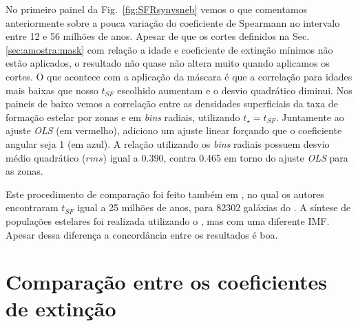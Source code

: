 No primeiro painel da Fig.\ \ref{fig:SFRsynvsneb} vemos o que comentamos anteriormente sobre a pouca
variação do coeficiente de Spearmann no intervalo entre 12 e 56 milhões de anos. Apesar de que os
cortes definidos na Sec. \ref{sec:amostra:mask} com relação a idade e coeficiente de extinção
mínimos não estão aplicados, o resultado não quase não altera muito quando aplicamos os cortes. O
que acontece com a aplicação da máscara é que a correlação para idades mais baixas que nosso
$t_{SF}$ escolhido aumentam e o desvio quadrático diminui. Nos paineis de baixo vemos a correlação
entre as densidades superficiais da taxa de formação estelar por zonas e em {\em bins} radiais,
utilizando $t_\star = t_{SF}$. Juntamente ao ajuste {\em OLS} (em vermelho), adiciono um ajuste
linear forçando que o coeficiente angular seja 1 (em azul). A relação utilizando os {\em bins}
radiais possuem desvio médio quadrático ($rms$) igual a 0.390, contra 0.465 em torno do ajuste {\em
OLS} para as zonas.
 
Este procedimento de comparação foi feito também em \citet{Asari.etal.2007a}, no qual os autores
encontraram $t_{SF}$ igual a 25 milhões de anos, para 82302 galáxias do \SDSS. A síntese de
populações estelares foi realizada utilizando o \starlight, mas com uma diferente IMF. Apesar dessa
diferença a concordância entre os resultados é boa.


\section{Comparação entre os coeficientes de extinção}
\label{sec:synvsneb:tauv}


